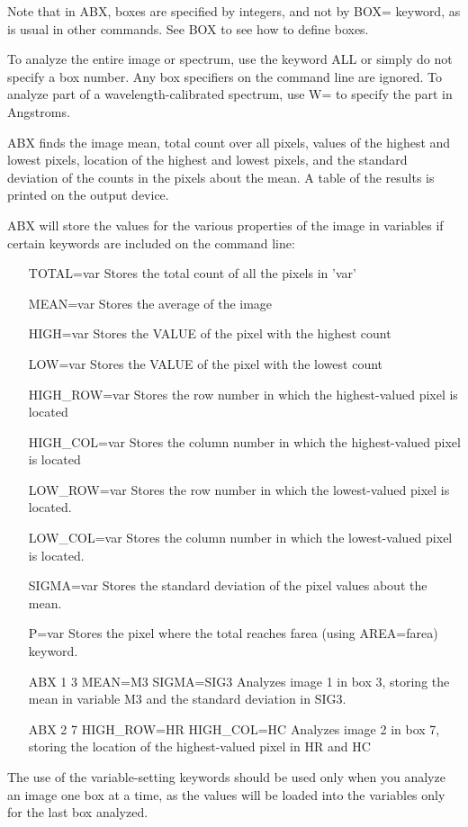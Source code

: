 Note that in ABX, boxes are specified by integers, and not by BOX= keyword,
as is usual in other commands.  See BOX to see how to define boxes.

To analyze the entire image or spectrum, use the keyword ALL or simply do
not specify a box number. Any box specifiers on the command line are
ignored.  To analyze part of a wavelength-calibrated spectrum, use W= to
specify the part in Angstroms.

ABX finds the image mean, total count over all pixels, values of the
highest and lowest pixels, location of the highest and lowest pixels, and
the standard deviation of the counts in the pixels about the mean. A table
of the results is printed on the output device.

ABX will store the values for the various properties of the image in
variables if certain keywords are included on the command line:
\begin{itemize}
  \item[TOTAL=var\hfill]{Stores the total count of all the pixels in 'var'}
  \item[MEAN=var\hfill]{Stores the average of the image}
  \item[HIGH=var\hfill]{Stores the VALUE of the pixel with the highest count}
  \item[LOW=var\hfill]{Stores the VALUE of the pixel with the lowest count}
  \item[HIGH\_ROW=var\hfill]{Stores the row number in which the highest-valued
       pixel is located}
  \item[HIGH\_COL=var\hfill]{Stores the column number in which the 
       highest-valued pixel is located}
  \item[LOW\_ROW=var\hfill]{Stores the row number in which the lowest-valued
       pixel is located.}
  \item[LOW\_COL=var\hfill]{Stores the column number in which the lowest-valued
       pixel is located.}
  \item[SIGMA=var\hfill]{Stores the standard deviation of the pixel values
       about the mean.}
  \item[P=var \hfill]{ Stores the pixel where the total reaches farea
       (using AREA=farea) keyword.}
\end{itemize}

\begin{itemize}
  \item[ABX 1 3 MEAN=M3 SIGMA=SIG3\hfill]{Analyzes image 1 in box 3, storing
       the mean in variable M3 and the standard deviation in SIG3.}
  \item[ABX 2 7 HIGH\_ROW=HR HIGH\_COL=HC\hfill]{ Analyzes image 2 in box 7, 
       storing the location of the highest-valued pixel in HR and HC}
\end{itemize}
The use of the variable-setting keywords should be used only when you
analyze an image one box at a time, as the values will be loaded into the
variables only for the last box analyzed.


